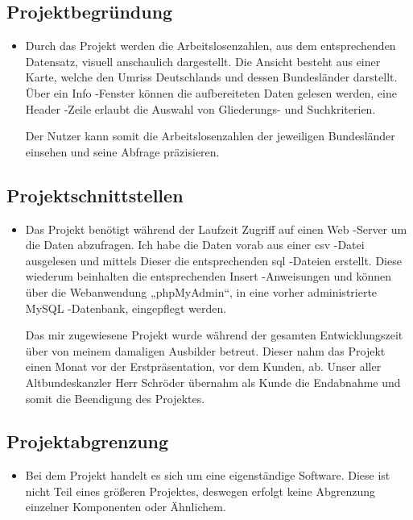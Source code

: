 \subsection{Projektbegründung} 
\label{sec:Projektbegruendung}
\begin{itemize}
	\item Durch das Projekt werden die Arbeitslosenzahlen, aus dem entsprechenden Datensatz, visuell anschaulich dargestellt. Die Ansicht besteht aus einer Karte, welche den Umriss Deutschlands und dessen Bundesländer darstellt. Über ein Info -Fenster können die aufbereiteten Daten gelesen werden, eine Header -Zeile erlaubt die Auswahl von Gliederungs- und Suchkriterien.  

Der Nutzer kann somit die Arbeitslosenzahlen der jeweiligen Bundesländer einsehen und seine Abfrage präzisieren. 
\end{itemize}


\subsection{Projektschnittstellen} 
\label{sec:Projektschnittstellen}
\begin{itemize}
	\item Das Projekt benötigt während der Laufzeit Zugriff auf einen Web -Server um die Daten abzufragen. Ich habe die Daten vorab aus einer csv -Datei ausgelesen und mittels Dieser die entsprechenden sql -Dateien erstellt. Diese wiederum beinhalten die entsprechenden Insert -Anweisungen und können über die Webanwendung „phpMyAdmin“, in eine vorher administrierte MySQL -Datenbank, eingepflegt werden. 

Das mir zugewiesene Projekt wurde während der gesamten Entwicklungszeit über von meinem damaligen Ausbilder betreut. Dieser nahm das Projekt einen Monat vor der Erstpräsentation, vor dem Kunden, ab. Unser aller Altbundeskanzler Herr Schröder übernahm als Kunde die Endabnahme und somit die Beendigung des Projektes. 
\end{itemize}


\subsection{Projektabgrenzung} 
\label{sec:Projektabgrenzung}
\begin{itemize}
	\item Bei dem Projekt handelt es sich um eine eigenständige Software. Diese ist nicht Teil eines größeren Projektes, deswegen erfolgt keine Abgrenzung einzelner Komponenten oder Ähnlichem. 
\end{itemize}
